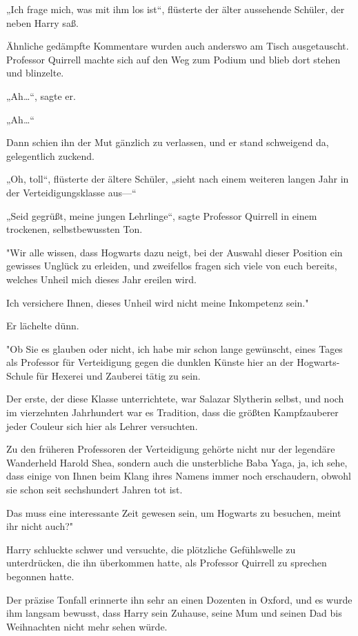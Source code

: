 {„Ich frage mich, was mit ihm los ist“, flüsterte der älter aussehende Schüler, der neben Harry saß.

Ähnliche gedämpfte Kommentare wurden auch anderswo am Tisch ausgetauscht. Professor Quirrell machte sich auf den Weg zum Podium und blieb dort stehen und blinzelte.

„Ah…“, sagte er.

„Ah…“

Dann schien ihn der Mut gänzlich zu verlassen, und er stand schweigend da, gelegentlich zuckend.

„Oh, toll“, flüsterte der ältere Schüler, „sieht nach einem weiteren langen Jahr in der Verteidigungsklasse aus—“

„Seid gegrüßt, meine jungen Lehrlinge“, sagte Professor Quirrell in einem trockenen, selbstbewussten Ton.

"Wir alle wissen, dass Hogwarts dazu neigt, bei der Auswahl dieser Position ein gewisses Unglück zu erleiden, und zweifellos fragen sich viele von euch bereits, welches Unheil mich dieses Jahr ereilen wird.

Ich versichere Ihnen, dieses Unheil wird nicht meine Inkompetenz sein."

Er lächelte dünn.

"Ob Sie es glauben oder nicht, ich habe mir schon lange gewünscht, eines Tages als Professor für Verteidigung gegen die dunklen Künste hier an der Hogwarts-Schule für Hexerei und Zauberei tätig zu sein.

Der erste, der diese Klasse unterrichtete, war Salazar Slytherin selbst, und noch im vierzehnten Jahrhundert war es Tradition, dass die größten Kampfzauberer jeder Couleur sich hier als Lehrer versuchten.

Zu den früheren Professoren der Verteidigung gehörte nicht nur der legendäre Wanderheld Harold Shea, sondern auch die unsterbliche Baba Yaga, ja, ich sehe, dass einige von Ihnen beim Klang ihres Namens immer noch erschaudern, obwohl sie schon seit sechshundert Jahren tot ist.

Das muss eine interessante Zeit gewesen sein, um Hogwarts zu besuchen, meint ihr nicht auch?"

Harry schluckte schwer und versuchte, die plötzliche Gefühlswelle zu unterdrücken, die ihn überkommen hatte, als Professor Quirrell zu sprechen begonnen hatte.

Der präzise Tonfall erinnerte ihn sehr an einen Dozenten in Oxford, und es wurde ihm langsam bewusst, dass Harry sein Zuhause, seine Mum und seinen Dad bis Weihnachten nicht mehr sehen würde.

}
